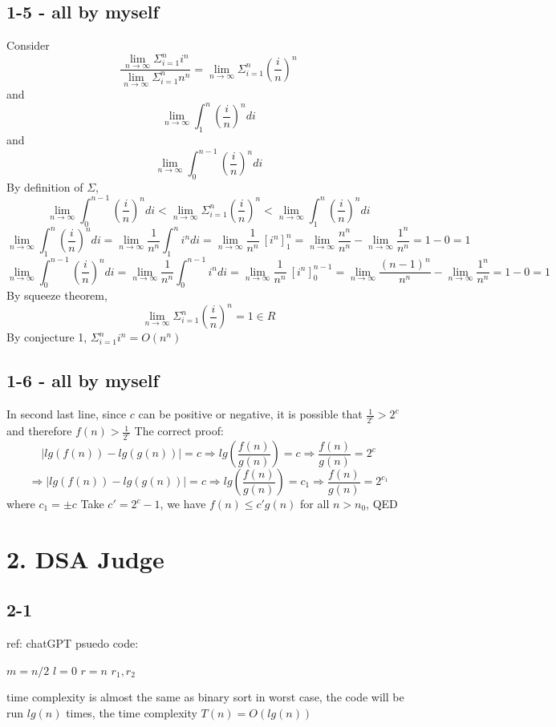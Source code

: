 \documentclass[12pt]{article}
\begin{document}
\subsection*{1-5 - all by myself}
Consider
\[\frac{\lim_{n \to \infty}{\Sigma_{i = 1}^{n}i^n}}{\lim_{n \to \infty}{\Sigma_{i = 1}^{n}n^n}} = \lim_{n \to \infty}{\Sigma_{i = 1}^{n}(\frac{i}{n})^n}\]
and
\[\lim_{n \to \infty}{\int^n_1(\frac{i}{n})^n di}\]
and
\[\lim_{n \to \infty}{\int^{n - 1}_0(\frac{i}{n})^n di}\]
By definition of $\Sigma$,
\[\lim_{n \to \infty}{\int^{n - 1}_0(\frac{i}{n})^n di}<\lim_{n \to \infty}{\Sigma_{i = 1}^{n}(\frac{i}{n})^n}<\lim_{n \to \infty}{\int^n_1(\frac{i}{n})^n di}\]
\[\lim_{n \to \infty}{\int^n_1(\frac{i}{n})^n di} = \lim_{n \to \infty}{\frac{1}{n^n}\int^n_1 i^n di} = \lim_{n \to \infty}{\frac{1}{n^n}\ \left[i^n\right]^n_1 }=\lim_{n \to \infty}{\frac{n^n}{n^n}}-\lim_{n \to \infty}{\frac{1^n}{n^n}}=1-0=1\]
\[\lim_{n \to \infty}{\int^{n-1}_0(\frac{i}{n})^n di} = \lim_{n \to \infty}{\frac{1}{n^n}\int^{n-1}_0 i^n di} = \lim_{n \to \infty}{\frac{1}{n^n}\ \left[i^n\right]^{n-1}_0 }=\lim_{n \to \infty}{\frac{(n-1)^n}{n^n}}-\lim_{n \to \infty}{\frac{1^n}{n^n}}=1-0=1\]
By squeeze theorem,
\[\lim_{n \to \infty}{\Sigma_{i = 1}^{n}(\frac{i}{n})^n} = 1\in R\]
By conjecture 1, ${\Sigma_{i = 1}^{n}i^n} = O(n^n)$

\subsection*{1-6 - all by myself}
In second last line, since $c$ can be positive or negative, it is possible that $\frac{1}{2^c}>2^c$ and therefore $f(n)> \frac{1}{2^c}$\newline
The correct proof:
\[|lg(f(n))-lg(g(n))|=c\Rightarrow lg(\frac{f(n)}{g(n)}) = c \Rightarrow\frac{f(n)}{g(n)}=2^c\]
\[\Rightarrow |lg(f(n))-lg(g(n))|=c\Rightarrow lg(\frac{f(n)}{g(n)}) = c_1 \Rightarrow\frac{f(n)}{g(n)}=2^{c_1}\]
where $c_1 = \pm c$\newline
Take $c' = 2^c-1$, we have $f(n)\leq c'g(n)$ for all $n > n_0$, QED\newpage

\section*{2. DSA Judge}
\subsection*{2-1}
ref: chatGPT\newline
psuedo code:
\begin{algorithmic}
    \State $m= n/2$
    \State $l = 0$
    \State $r = n$
    \Else
    \EndIf
    \EndWhile
    \EndFor
    \State\Return $r_1, r_2$
    \EndProcedure
\end{algorithmic}
time complexity is almost the same as binary sort in worst case, the code will be run $lg(n)$ times, the time complexity $T(n) = O(lg(n))$
\end{document}
